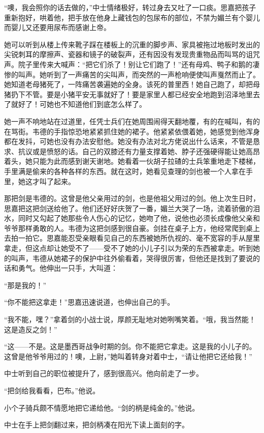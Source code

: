 \par “噢，我会照你的话去做的，”中士情绪极好，转过身去又吐了一口痰。思嘉把孩子重新抱好，哄着他，把手放在他身上藏钱包的包尿布的部位，不禁为媚兰有个婴儿而婴儿又还要用尿布而感谢上帝。
\par 她可以听到从楼上传来靴子踩在楼板上的沉重的脚步声、家具被拖过地板时发出的尖锐刺耳的摩擦声、瓷器和镜子的破裂声，还有因没有发现贵重物品而叫骂的诅咒声。院子里传来大喊声：“把它们杀了！别让它们跑了！”还有母鸡、鸭子和鹅的凄惨的叫声。她听到了一声痛苦的尖叫声，而突然的一声枪响便使叫声戛然而止了。她知道老母猪死了，一阵痛苦袭遍她的全身。该死的普里西！她自己跑了，却把母猪扔下不管。要是小猪平安无事就好了！要是家里人都已经安全地跑到沼泽地里去了就好了！可她也不知道他们到底怎么样了。
\par 她一声不响地站在过道里，任凭士兵们在她周围闹得天翻地覆，有的在喊叫，有的在骂街。韦德的手指惊恐地紧紧抓住她的裙子。他紧紧依偎着她，她感觉到他浑身都在发抖，可她也没有办法安慰他。她没有办法对北方佬说出什么话来，不管是恳求、抗议或是愤怒的话。自己的双膝还有力量支撑着她、脖子还强硬得能让她高昂着头，她只能为此而感到谢天谢地。她看着一伙胡子拉碴的士兵笨重地走下楼梯，手里满是偷来的各种各样的东西。就在这时，她看见查理的剑也被一个人拿在手里，她这才叫了起来。
\par 那把剑是韦德的。这曾是他父亲用过的剑，也是他祖父用过的剑。他上次生日时，思嘉把这把剑送给他了。他们还好好庆贺了一番，媚兰大哭了一场，流着骄傲的泪水，同时又勾起了她那些令人伤心的记忆，她吻了他，说他也必须长成像他父亲和爷爷那样勇敢的人。韦德为这把剑感到很自豪。剑挂在桌子上方，他经常爬到桌上去拍一拍它。思嘉能忍受亲眼看见自己的东西被她所仇视的、毫不宽容的手从屋里拿走，但这点却让她受不了——受不了她的小儿子引以为荣的东西被拿走。听到她的叫声，韦德从她裙子的保护中往外偷看着，哭得很厉害，但他还是找到了要说的话和勇气。他伸出一只手，大叫道：
\par “那是我的！”
\par “你不能把这拿走！”思嘉迅速说道，也伸出自己的手。
\par “我不能，嘿？”拿着剑的小战士说，厚颜无耻地对她咧嘴笑着。“哦，我当然能！这是造反之剑！”
\par “这——不是。这是墨西哥战争时期的剑。你不能把它拿走。这是我的小儿子的。这曾是他爷爷用过的！噢，上尉，”她叫着转身对着中士，“请让他把它还给我！”
\par 中士听到自己的职位被提升了，感到很高兴。他向前走了一步。
\par “把剑给我看看，巴布。”他说。
\par 小个子骑兵颇不情愿地把它递给他。“剑的柄是纯金的。”他说。
\par 中士在手上把剑翻过来，把剑柄凑在阳光下读上面刻的字。
